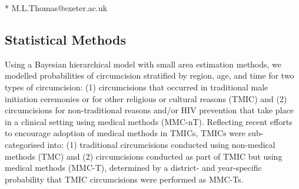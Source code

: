 \documentclass{article}
\begin{document}
* M.L.Thomas@exeter.ac.uk

\newpage



\begin{appendix}


\newpage

\tableofcontents

\newpage


\section{Statistical Methods}
\label{sec::methods}


\noindent Using a Bayesian hierarchical model with small area estimation methods, we modelled probabilities of circumcision stratified by region, age, and time for two types of circumcision: (1) circumcisions that occurred in traditional male initiation ceremonies or for other religious or cultural reasons (TMIC) and (2) circumcisions for non-traditional reasons and/or HIV prevention that take place in a clinical setting using medical methods (MMC-nT). Reflecting recent efforts to encourage adoption of medical methods in TMICs, TMICs were sub-categorised into: (1) traditional circumcisions conducted using non-medical methods (TMC) and (2) circumcisions conducted as part of TMIC but using medical methods (MMC-T), determined by a district- and year-specific probability that TMIC circumcisions were performed as MMC-Ts.\\


\end{appendix}
\end{document}
